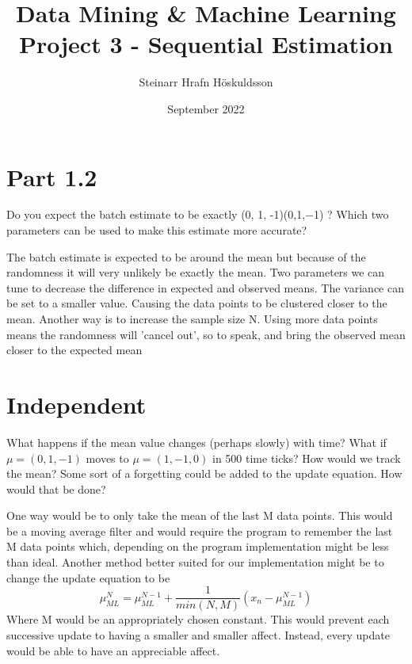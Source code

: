 \documentclass{article}
\title{Data Mining \& Machine Learning \\ \large Project 3 - Sequential Estimation}
\author{Steinarr Hrafn Höskuldsson}
\date{September 2022}
\newcommand{\mycomment}[1]{}
\begin{document}
\maketitle
\mycomment{
\begin{figure}[h]
    \centering
    \texttt{[image: LAB3/Basic1.png]}
    \caption{"Switch test" Breadboard set up}
    \label{fig:Switch_test}
\end{figure}



}
\section*{Part 1.2}
\begin{quoting}
Do you expect the batch estimate to be exactly (0, 1, -1)(0,1,−1) ? Which two parameters can be used to make this estimate more accurate?
\end{quoting}
The batch estimate is expected to be around the mean but because of the randomness it will very unlikely be exactly the mean. Two parameters we can tune to decrease the difference in expected and observed means. The variance can be set to a smaller value. Causing the data points to be clustered closer to the mean. Another way is to increase the sample size N. Using more data points means the randomness will 'cancel out', so to speak, and bring the observed mean closer to the expected mean

\section*{Independent}
\begin{quoting}
What happens if the mean value changes (perhaps slowly) with time? What if $\mu =(0,1,-1)$ moves to $\mu=(1,-1,0)$ in 500 time ticks? How would we track the mean? Some sort of a forgetting could be added to the update equation. How would that be done?
\end{quoting}

One way would be to only take the mean of the last M data points. This would be a moving average filter and would require the program to remember the last M data points which, depending on the program implementation might be less than ideal. Another method better suited for our implementation might be to change the update equation to be 
\[\mu_{ML}^{N} = \mu_{ML}^{N-1} + \frac{1}{min(N, M)}(x_n - \mu_{ML}^{N-1})\]
Where M would be an appropriately chosen constant. This would prevent each successive update to having a smaller and smaller affect. Instead, every update would be able to have an appreciable affect.
\end{document}

